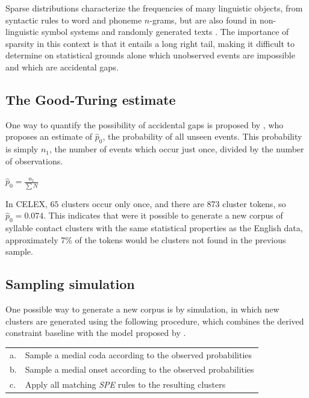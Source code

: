 Sparse distributions characterize the frequencies of many linguistic objects, from syntactic rules \citep{Yang2009} to word \citep{Teahan1998,Baroni2009} and phoneme \citep{Belevitch1956,Daland2011a} $n$-grams, but are also found in non-linguistic symbol systems \citep{Mandelbrot1954,Miller1957,Chomsky1958,Sproat2010} and randomly generated texts \citep{Miller1957,Li1992}. The importance of sparsity in this context is that it entails a long right tail, making it difficult to determine on statistical grounds alone which unobserved events are impossible and which are accidental gaps.

\subsection{The Good-Turing estimate}

One way to quantify the possibility of accidental gaps is proposed by \citet{Good1953}, who proposes an estimate of $\hat{p}_0$, the probability of all unseen events. This probability is simply $n_1$, the number of events which occur just once, divided by the number of observations.

\begin{unlabeledexample}
$\displaystyle \hat{p}_0 = \frac{n_1}{\displaystyle\sum N}$
\end{unlabeledexample}

\noindent In CELEX, $65$ clusters occur only once, and there are 873 cluster tokens, so $\hat{p}_0 = 0.074$. This indicates that were it possible to generate a new corpus of syllable contact clusters with the same statistical properties as the English data, approximately 7\% of the tokens would be clusters not found in the previous sample.

\subsection{Sampling simulation}

One possible way to generate a new corpus is by simulation, in which new clusters are generated using the following procedure, which combines the derived constraint baseline with the model proposed by \citet{Pierrehumbert1994}.

\begin{example}
\begin{tabular}{l l}
a. & Sample a medial coda according to the observed probabilities  \\
b. & Sample a medial onset according to the observed probabilities \\
c. & Apply all matching \emph{SPE} rules to the resulting clusters \\
\end{tabular}
\end{example}

